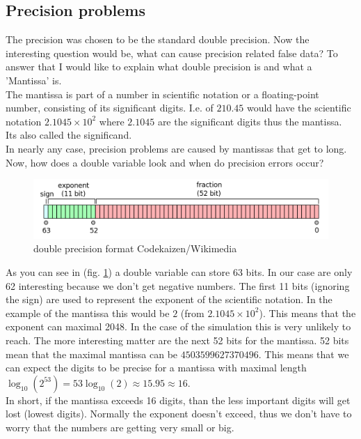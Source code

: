 \documentclass[a4paper,10pt]{scrartcl}
\begin{document}
	\subsection{Precision problems}
	The precision was chosen to be the standard double precision. Now the interesting question would be, what can cause precision related false data? To answer that I would like to explain what double precision is and what a 'Mantissa' is. \\
	The mantissa is part of a number in scientific notation or a floating-point number, consisting of its significant digits. I.e. of $ 210.45 $ would have the scientific notation $ 2.1045 \times 10^{2}$ where $ 2.1045 $ are the significant digits thus the mantissa. Its also called the significand. \\
	In nearly any case, precision problems are caused by mantissas that get to long. Now, how does a double variable look and when do precision errors occur?
	\begin{figure}
		\centering
		\includegraphics[width=1\linewidth]{Bilder/Double_Floating_Point_Format.png}
		\caption{double precision format \textregistered Codekaizen/Wikimedia}
		\label{fig:Double_Floating_Point_Format}
	\end{figure}
	As you can see in (fig. \ref{fig:Double_Floating_Point_Format}) a double variable can store 63 bits. In our case are only 62 interesting because we don't get negative numbers. The first 11 bits (ignoring the sign) are used to represent the exponent of the scientific notation. In the example of the mantissa this would be $ 2 $ (from $ 2.1045 \times 10^{2}$). This means that the exponent can maximal 2048. In the case of the simulation this is very unlikely to reach. The more interesting matter are the next 52 bits for the mantissa. 52 bits mean that the maximal mantissa can be $ 4503599627370496 $. This means that we can expect the digits to be precise for a mantissa with maximal length $ \log_{10}(2^{53}) = 53\log_{10}(2) \approx 15.95 \approx 16 $.\\
	In short, if the mantissa exceeds 16 digits, than the less important digits will get lost (lowest digits). Normally the exponent doesn't exceed, thus we don't have to worry that the numbers are getting very small or big.
\end{document}
